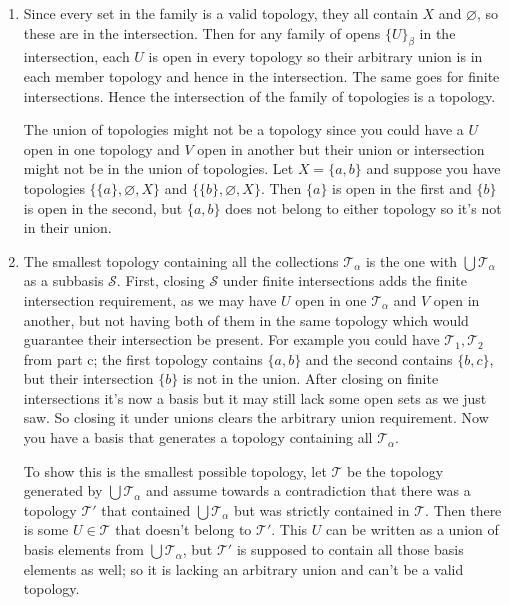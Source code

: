 \documentclass{article}
\begin{document}
\begin{enumerate}[label=\alph*)]
  \item Since every set in the family is a valid topology, they all contain $X$ and $\varnothing$, so these are in the intersection. Then for any family of opens $\{U\}_\beta$ in the intersection, each $U$ is open in every topology so their arbitrary union is in each member topology and hence in the intersection. The same goes for finite intersections. Hence the intersection of the family of topologies is a topology.

        The union of topologies might not be a topology since you could have a $U$ open in one topology and $V$ open in another but their union or intersection might not be in the union of topologies. Let $X = \{a, b\}$ and suppose you have topologies $\{\{a\}, \varnothing, X\}$ and $\{\{b\}, \varnothing, X\}$. Then $\{a\}$ is open in the first and $\{b\}$ is open in the second, but $\{a, b\}$ does not belong to either topology so it's not in their union.

  \item The smallest topology containing all the collections $\mathscr{T}_\alpha$ is the one with $\bigcup \mathscr{T}_\alpha$ as a subbasis $\mathscr{S}$. First, closing $\mathscr{S}$ under finite intersections adds the finite intersection requirement, as we may have $U$ open in one $\mathscr{T}_\alpha$ and $V$ open in another, but not having both of them in the same topology which would guarantee their intersection be present. For example you could have $\mathscr{T}_1, \mathscr{T}_2$ from part c; the first topology contains $\{a, b\}$ and the second contains $\{b, c\}$, but their intersection $\{b\}$ is not in the union. After closing on finite intersections it's now a basis but it may still lack some open sets as we just saw. So closing it under unions clears the arbitrary union requirement. Now you have a basis that generates a topology containing all $\mathscr{T}_\alpha$.

        To show this is the smallest possible topology, let $\mathscr{T}$ be the topology generated by $\bigcup \mathscr{T}_\alpha$ and assume towards a contradiction that there was a topology $\mathscr{T}'$ that contained $\bigcup \mathscr{T}_\alpha$ but was strictly contained in $\mathscr{T}$. Then there is some $U \in \mathscr{T}$ that doesn't belong to $\mathscr{T}'$. This $U$ can be written as a union of basis elements from $\bigcup \mathscr{T}_\alpha$, but $\mathscr{T}'$ is supposed to contain all those basis elements as well; so it is lacking an arbitrary union and can't be a valid topology.


\end{enumerate}
\end{document}
